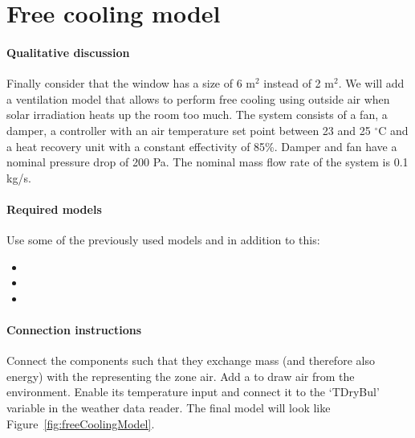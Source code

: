 \documentclass[10pt,a4paper]{article}
\begin{document}
\section{Free cooling model}
\paragraph{Qualitative discussion}
Finally consider that the window has a size of
6 m$^2$ instead of 2 m$^2$.
We will add a ventilation model that allows to
perform free cooling using outside air when
solar irradiation heats up the room too much.
The system consists of a fan,
a damper,
a controller with an air temperature 
set point between 23 and 25 $^{\circ}$C
and a heat recovery unit with a constant effectivity of 85\%.
Damper and fan have a nominal pressure drop of 200 Pa. 
The nominal mass flow rate of the system is 0.1 kg/s.


\paragraph{Required models}
Use some of the previously used models and in addition to this:
\begin{itemize}
\item {}
\item {}
\item {}
\end{itemize}

\paragraph{Connection instructions}
Connect the components such that they exchange mass 
(and therefore also energy) with the 
representing the zone air.
Add a  to draw air from the environment.
Enable its temperature input and connect it to the `TDryBul'
variable in the weather data reader. The final model will look like
Figure~\ref{fig:freeCoolingModel}.
\end{document}
